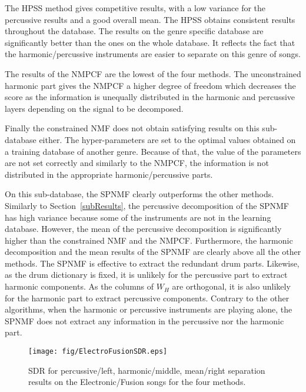 The HPSS method gives competitive results, with a low variance for the percussive results and a good overall mean. The HPSS obtains consistent results throughout the database. The results on the genre specific database are significantly better than the ones on the whole database. It reflects the fact that the harmonic/percussive instruments are easier to separate on this genre of songs. 
 
The results of the NMPCF are the lowest of the four methods. The unconstrained harmonic part gives the NMPCF a higher degree of freedom which decreases the score as the information is unequally distributed in the harmonic and percussive layers depending on the signal to be decomposed. 

Finally the constrained NMF does not obtain satisfying results on this sub-database either. The hyper-parameters are set to the optimal values obtained on a training database of another genre. Because of that, the value of the parameters are not set correctly and similarly to the NMPCF, the information is not distributed in the appropriate harmonic/percussive parts. 


On this sub-database, the SPNMF clearly outperforms the other methods. Similarly to Section~\ref{subResults}, the percussive decomposition of the SPNMF has high variance because some of the instruments are not in the learning database. However, the mean of the percussive decomposition is significantly higher than the constrained NMF and the NMPCF. Furthermore, the harmonic decomposition and the mean results of the SPNMF are clearly above all the other methods. The SPNMF is effective to extract the redundant drum parts. Likewise, as the drum dictionary is fixed, it is unlikely for the percussive part to extract harmonic components. As the columns of $W_{H}$ are orthogonal, it is also unlikely for the harmonic part to extract percussive components. Contrary to the other algorithms, when the harmonic or percussive instruments are playing alone, the SPNMF does not extract any information in the percussive nor the harmonic part.



\begin{figure}[htb]

  \centering 
  \texttt{[image: fig/ElectroFusionSDR.eps]}
  \caption{\label{ElectroFusionSDR} SDR for percussive/left, harmonic/middle, mean/right separation results on the Electronic/Fusion songs for the four methods.}
  
\end{figure}

